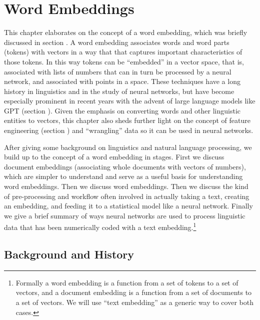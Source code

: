 \chapter{Word Embeddings}\label{ch_word_embeddings}


This chapter elaborates on the concept of a word embedding, which was briefly discussed in section . A word embedding associates words and word parts (tokens) with vectors in a way that that captures important characteristics of those tokens. In this way tokens can be ``embedded'' in a vector space, that is, associated with lists of numbers that can in turn be processed by a neural network, and associated with points in a space. These techniques have a long history in linguistics and in the study of neural networks, but have become especially prominent in recent years with the advent of large language models like GPT (section ). Given the emphasis on converting words and other linguistic entities to vectors, this chapter also sheds further light on the concept of feature engineering (section ) and ``wrangling'' data so it can be used in neural networks.

After giving some background on linguistics and natural language processing, we build up to the concept of a word embedding in stages. First we discuss document embeddings (associating whole documents with vectors of numbers), which are simpler to understand and serve as a useful basis for understanding word embeddings.  Then we discuss word embeddings. Then we discuss the kind of pre-processing and workflow often involved in actually taking a text, creating an embedding, and feeding it to a statistical model like a neural network. Finally we give a brief summary of ways neural networks are used to process linguistic data that has been numerically coded with a text embedding.\footnote{Formally a word embedding is a function from a set of tokens to a set of vectors, and a document embedding is a function from a set of documents to a set of vectors.  We will use ``text embedding'' as a generic way to cover both cases.}

\section{Background and History}

